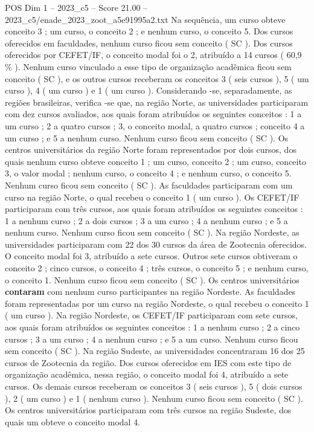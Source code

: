 \begin{textsample}{POS Dim 1 – 2023\_c5 – Score 21.00 – 2023\_c5/enade\_2023\_zoot\_a5e91995a2.txt}
Na sequência, um curso obteve conceito 3 ; um curso, o conceito 2 ; e nenhum curso, o conceito 5.
Dos cursos oferecidos em faculdades, nenhum curso ficou sem conceito ( SC ).
Dos cursos oferecidos por CEFET/IF, o conceito modal foi o 2, atribuído a 14 cursos ( 60,9 \% ).
Nenhum curso vinculado a esse tipo de organização acadêmica ficou sem conceito ( SC ), e os outros cursos receberam os conceitos 3 ( seis cursos ), 5 ( um curso ), 4 ( um curso ) e 1 ( um curso ).
Considerando -se, separadamente, as regiões brasileiras, verifica -se que, na região Norte, as universidades participaram com dez cursos avaliados, aos quais foram atribuídos os seguintes conceitos : 1 a um curso ; 2 a quatro cursos ; 3, o conceito modal, a quatro cursos ; conceito 4 a um curso ; e 5 a nenhum curso.
Nenhum curso ficou sem conceito ( SC ).
Os centros universitários da região Norte foram representados por dois cursos, dos quais nenhum curso obteve conceito 1 ; um curso, conceito 2 ; um curso, conceito 3, o valor modal ; nenhum curso, o conceito 4 ; e nenhum curso, o conceito 5.
Nenhum curso ficou sem conceito ( SC ).
As faculdades participaram com um curso na região Norte, o qual recebeu o conceito 1 ( um curso ).
Os CEFET/IF participaram com três cursos, aos quais foram atribuídos os seguintes conceitos : 1 a nenhum curso ; 2 a dois cursos ; 3 a um curso ; 4 a nenhum curso ; e 5 a nenhum curso.
Nenhum curso ficou sem conceito ( SC ).
Na região Nordeste, as universidades participaram com 22 dos 30 cursos da área de Zootecnia oferecidos.
O conceito modal foi 3, atribuído a sete cursos.
Outros sete cursos obtiveram o conceito 2 ; cinco cursos, o conceito 4 ; três cursos, o conceito 5 ; e nenhum curso, o conceito 1.
Nenhum curso ficou sem conceito ( SC ).
Os centros universitários \textbf{contaram} com nenhum curso participantes na região Nordeste.
As faculdades foram representadas por um curso na região Nordeste, o qual recebeu o conceito 1 ( um curso ).
Na região Nordeste, os CEFET/IF participaram com sete cursos, aos quais foram atribuídos os seguintes conceitos : 1 a nenhum curso ; 2 a cinco cursos ; 3 a um curso ; 4 a nenhum curso ; e 5 a um curso.
Nenhum curso ficou sem conceito ( SC ).
Na região Sudeste, as universidades concentraram 16 dos 25 cursos de Zootecnia da região.
Dos cursos oferecidos em IES com este tipo de organização acadêmica, nessa região, o conceito modal foi 4, atribuído a sete cursos.
Os demais cursos receberam os conceitos 3 ( seis cursos ), 5 ( dois cursos ), 2 ( um curso ) e 1 ( nenhum curso ).
Nenhum curso ficou sem conceito ( SC ).
Os centros universitários participaram com três cursos na região Sudeste, dos quais um obteve o conceito modal 4.

\end{textsample}
